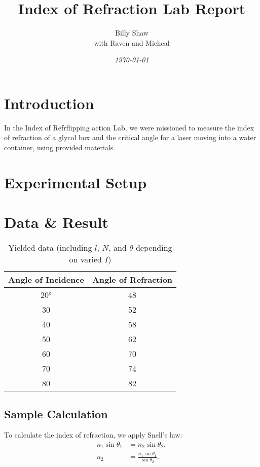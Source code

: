 \documentclass{elegantpaper}
\title{Index of Refraction Lab Report}
\author{Billy Shaw \\ with Raven and Micheal}
\date{\small\itshape\today}
\begin{document}
\maketitle

\section{Introduction}
In the Index of Refrflipping action Lab, we were missioned to measure the index of refraction of a glycol box and the critical angle for a laser moving into a water container, using provided materials.

\section{Experimental Setup}

\section{Data \& Result}
\begin{table}[!ht]\footnotesize
	\centering
    \begin{tabular}{c|c}
        Angle of Incidence & Angle of Refraction \\ \hline
        \ang{20}                 & 48                  \\
        30                 & 52                  \\
        40                 & 58                  \\
        50                 & 62                  \\
        60                 & 70                  \\
        70                 & 74                  \\
        80                 & 82                 
        \end{tabular}

  \caption{Yielded data (including $l$, $N$, and $\theta$ depending on varied $I$)}
	\label{label:tests}
\end{table}

\subsection{Sample Calculation}
To calculate the index of refraction, we apply Snell's law:
\begin{align}
    n_1\sin{\theta_1}&=n_2\sin{\theta_2} \label{snells_law}\tag{Snell's Law}, \\
    n_2&=\frac{n_1\sin{\theta_1}}{
        \sin{\theta_2}
    }.
\end{align}
\end{document}
